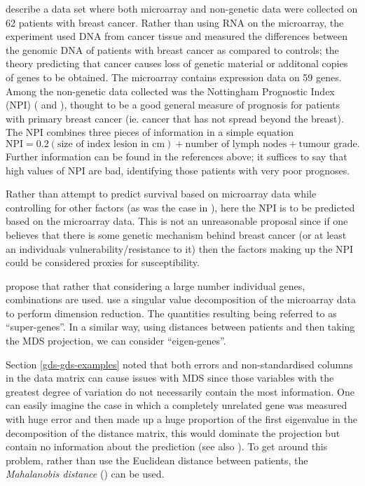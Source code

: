  describe a data set where both microarray and non-genetic data were collected on 62 patients with breast cancer. Rather than using RNA on the microarray, the experiment used DNA from cancer tissue and measured the differences between the genomic DNA of patients with breast cancer as compared to controls; the theory predicting that cancer causes loss of genetic material or additonal copies of genes to be obtained. The microarray contains expression data on 59 genes. Among the non-genetic data collected was the Nottingham Prognostic Index (NPI) (\cite{Haybittle1982} and \cite{Todd1987}), thought to be a good general measure of prognosis for patients with primary breast cancer (ie. cancer that has not spread beyond the breast). The NPI combines three pieces of information in a simple equation
\begin{equation}
\text{NPI} = 0.2(\text{size of index lesion in cm}) + \text{number of lymph nodes} + \text{tumour grade}.
\end{equation}
Further information can be found in the references above; it suffices to say that high values of NPI are bad, identifying those patients with very poor prognoses.

Rather than attempt to predict survival based on microarray data while controlling for other factors (as was the case in \cite[pp. 240-245]{ernstbook}), here the NPI is to be predicted based on the microarray data. This is not an unreasonable proposal since if one believes that there is some genetic mechanism behind breast cancer (or at least an individuals vulnerability/resistance to it) then the factors making up the NPI could be considered proxies for susceptibility. 

 propose that rather that considering a large number individual genes, combinations are used.  use a singular value decomposition of the microarray data to perform dimension reduction. The quantities resulting being referred to as ``super-genes''. In a similar way, using distances between patients and then taking the MDS projection, we can consider ``eigen-genes''.

Section \ref{gds-gds-examples} noted that both errors and non-standardised columns in the data matrix can cause issues with MDS since those variables with the greatest degree of variation do not necessarily contain the most information. One can easily imagine the case in which a completely unrelated gene was measured with huge error and then made up a huge proportion of the first eigenvalue in the decomposition of the distance matrix, this would dominate the projection but contain no information about the prediction (see also \cite[pp. 220-221]{ernstbook}). To get around this problem, rather than use the Euclidean distance between patients, the \textit{Mahalanobis distance} (\cite{mahalanobis}) can be used.

